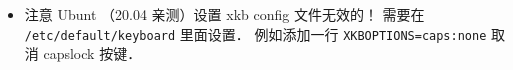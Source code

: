 
\begin{itemize}
\item 注意 Ubunt （20.04 亲测）设置 xkb config 文件无效的！ 需要在 \verb|/etc/default/keyboard| 里面设置． 例如添加一行 \verb|XKBOPTIONS=caps:none| 取消 capslock 按键．
\end{itemize}

